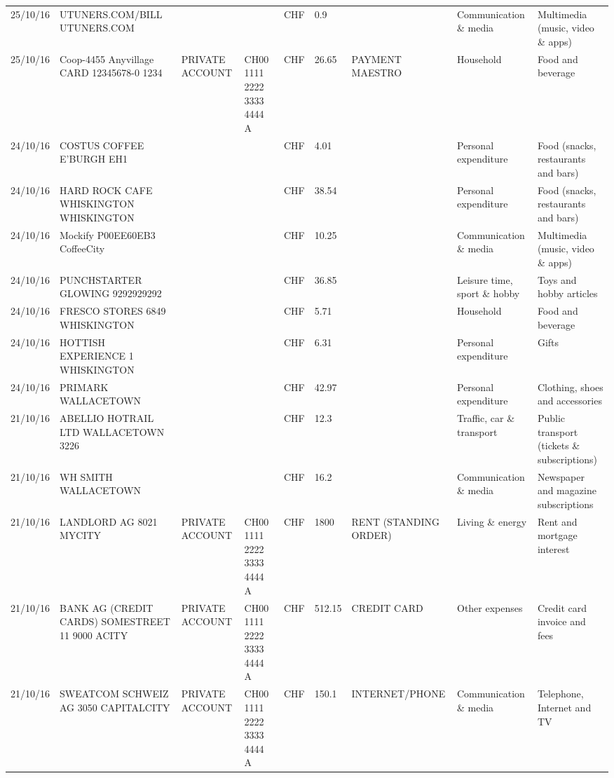\begin{landscape}
\begin{adjustwidth}{-2cm}{-2cm}
\begin{tiny}
\begin{longtable}{lp{4cm}llllp{3cm}ll}
		25/10/16 & UTUNERS.COM/BILL          UTUNERS.COM &       &       & CHF   & 0.9   &       & Communication \& media & Multimedia (music, video \& apps) \\
		25/10/16 & Coop-4455 Anyvillage CARD 12345678-0 1234 & PRIVATE ACCOUNT & CH00 1111 2222 3333 4444 A & CHF   & 26.65 & PAYMENT MAESTRO & Household & Food and beverage \\
		24/10/16 & COSTUS COFFEE             E'BURGH EH1 &       &       & CHF   & 4.01  &       & Personal expenditure & Food (snacks, restaurants and bars) \\
		24/10/16 & HARD ROCK CAFE WHISKINGTON WHISKINGTON &       &       & CHF   & 38.54 &       & Personal expenditure & Food (snacks, restaurants and bars) \\
		24/10/16 & Mockify P00EE60EB3       CoffeeCity &       &       & CHF   & 10.25 &       & Communication \& media & Multimedia (music, video \& apps) \\
		24/10/16 & PUNCHSTARTER GLOWING   9292929292 &       &       & CHF   & 36.85 &       & Leisure time, sport \& hobby & Toys and hobby articles \\
		24/10/16 & FRESCO STORES 6849        WHISKINGTON &       &       & CHF   & 5.71  &       & Household & Food and beverage \\
		24/10/16 & HOTTISH EXPERIENCE 1    WHISKINGTON &       &       & CHF   & 6.31  &       & Personal expenditure & Gifts \\
		24/10/16 & PRIMARK                  WALLACETOWN &       &       & CHF   & 42.97 &       & Personal expenditure & Clothing, shoes and accessories \\
		21/10/16 & ABELLIO HOTRAIL LTD     WALLACETOWN 3226 &       &       & CHF   & 12.3  &       & Traffic, car \& transport & Public transport (tickets \& subscriptions) \\
		21/10/16 & WH SMITH                 WALLACETOWN &       &       & CHF   & 16.2  &       & Communication \& media & Newspaper and magazine subscriptions \\
		21/10/16 & LANDLORD AG 8021 MYCITY & PRIVATE ACCOUNT & CH00 1111 2222 3333 4444 A & CHF   & 1800  & RENT (STANDING ORDER) & Living \& energy & Rent and mortgage interest \\
		21/10/16 & BANK AG (CREDIT CARDS) SOMESTREET 11 9000 ACITY & PRIVATE ACCOUNT & CH00 1111 2222 3333 4444 A & CHF   & 512.15 & CREDIT CARD & Other expenses & Credit card invoice and fees \\
		21/10/16 & SWEATCOM SCHWEIZ AG 3050 CAPITALCITY & PRIVATE ACCOUNT & CH00 1111 2222 3333 4444 A & CHF   & 150.1 & INTERNET/PHONE & Communication \& media & Telephone,  Internet and TV \\

\end{longtable}
\end{tiny}
\end{adjustwidth}
\end{landscape}
